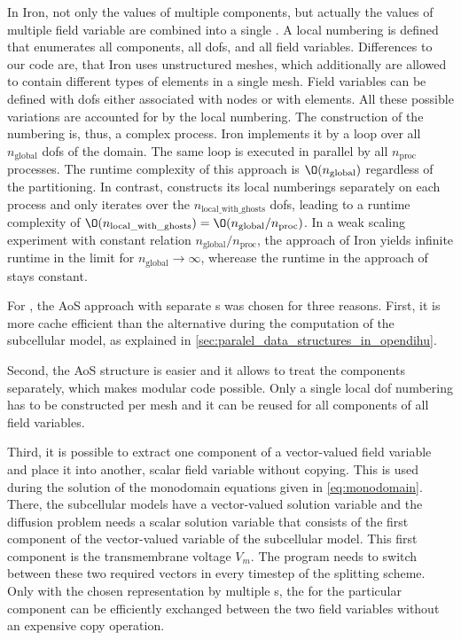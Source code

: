 In Iron, not only the values of multiple components, but actually the values of multiple field variable are combined into a single \Vec{}. A local numbering is defined that enumerates all components, all dofs, and all field variables. Differences to our code are, that Iron uses unstructured meshes, which additionally are allowed to contain different types of elements in a single mesh. Field variables can be defined with dofs either  associated with nodes or with elements. 
All these possible variations are accounted for by the local numbering. 
The construction of the numbering is, thus, a complex process. Iron implements it by a loop over all $n_\text{global}$ dofs of the domain. The same loop is executed in parallel by all $n_\text{proc}$ processes. The runtime complexity of this approach is $\O(n_\text{global})$ regardless of the partitioning. 
In contrast, \opendihu{} constructs its local numberings separately on each process and only iterates over the $n_\text{local\_with\_ghosts}$ dofs, leading to a runtime complexity of $\O(n_\text{local\_with\_ghosts}) = \O(n_\text{global} / n_\text{proc})$. In a weak scaling experiment with constant relation $n_\text{global} / n_\text{proc}$, the approach of Iron yields infinite runtime in the limit for $n_\text{global} \to \infty$, wherease the runtime in the approach of \opendihu{} stays constant.

For \opendihu{}, the AoS approach with separate \Vec{}s was chosen for three reasons. First, it is more cache efficient than the alternative during the computation of the subcellular model, as explained in \cref{sec:paralel_data_structures_in_opendihu}.

Second, the AoS structure is easier and it allows to treat the components separately, which makes modular code possible. Only a single local dof numbering has to be constructed per mesh and it can be reused for all components of all field variables.

Third, it is possible to extract one component of a vector-valued field variable and place it into another, scalar field variable without copying. This is used during the solution of the monodomain equations given in \cref{eq:monodomain}. There, the subcellular models have a vector-valued solution variable and the diffusion problem needs a scalar solution variable that consists of the first component of the vector-valued variable of the subcellular model. This first component is the transmembrane voltage $V_m$. The program needs to switch between these two required vectors in every timestep of the splitting scheme. Only with the chosen representation by multiple \Vec{}s, the \Vec{} for the particular component can be efficiently exchanged between the two field variables without an expensive copy operation.

